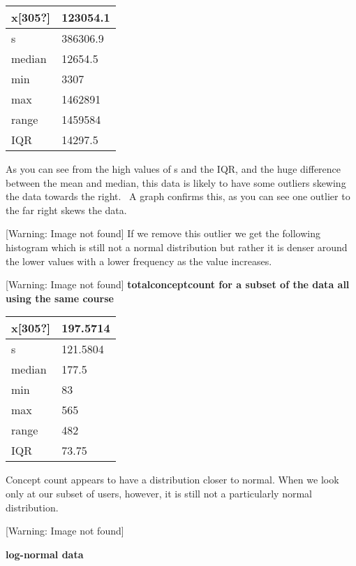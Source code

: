 \documentclass[12pt,twoside]{article}
\begin{document}
\begin{longtable}[l]{|p{3.5809598in}|p{3.5809598in}|}
\hline
x[305?] 
&
123054.1 
\\\hline
s 
&
386306.9 
\\\hline
median 
&
12654.5 
\\\hline
min
&
3307 
\\\hline
max
&
1462891 
\\\hline
range
&
1459584 
\\\hline
IQR
&
14297.5 
\\\hline
\end{longtable}
\newline
As you can see from the high values of s and the IQR, and the huge
difference between the mean and median, this data is likely to have
some outliers skewing the data towards the right.~ A graph confirms
this, as you can see one outlier to the far right skews the data.

 [Warning: Image not found]  
If we remove this outlier we get the following histogram which is still
not a normal distribution but rather it is denser around the lower
values with a lower frequency as the value increases. 

 [Warning: Image not found]  
\newline
\newline
\textbf{totalconceptcount for a subset of the data all using the same
course}



\begin{longtable}[l]{|p{3.5809598in}|p{3.5809598in}|}
\hline
x[305?] 
&
197.5714 
\\\hline
s 
&
121.5804 
\\\hline
median 
&
177.5 
\\\hline
min
&
83 
\\\hline
max
&
565 
\\\hline
range
&
482 
\\\hline
IQR
&
73.75 
\\\hline
\end{longtable}
\newline
Concept count appears to have a distribution closer to normal. When we
look only at our subset of users, however, it is still not a
particularly normal distribution.

 [Warning: Image not found]  

\bigskip

{\bfseries
log{}-normal data}
\end{document}
